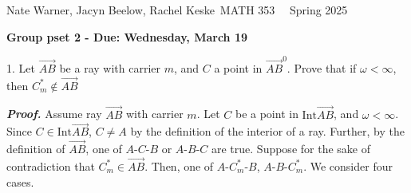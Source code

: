\documentclass{report}
\title{\Huge{}}
\author{\huge{Nathan Warner}}
\date{\huge{}}
\begin{document}
    \pagebreak \bigbreak \noindent 
    Nate Warner, Jacyn Beelow, Rachel Keske\ \quad \quad \quad \quad  MATH 353 \quad  \quad \quad \quad \quad \quad \ \ \quad \quad \quad \quad \quad \quad \quad Spring 2025
    \begin{center}
        \textbf{Group pset 2 - Due: Wednesday, March 19}
    \end{center}
    \bigbreak \noindent 
    \begin{mdframed}
        1. Let $\overrightarrow{AB}$ be a ray with carrier $m$, and $C$ a point in $\overrightarrow{AB}^{0} $. Prove that if $\omega < \infty$, then $C_{m}^{*} \not\in \overrightarrow{AB} $
    \end{mdframed}
    \bigbreak \noindent 
    \textbf{\textit{Proof.}} Assume ray $\overrightarrow{AB}$  with carrier $m$. Let $C$ be a point in $\text{Int}\overrightarrow{AB}$, and $\omega < \infty$.
    \bigbreak \noindent 
    Since $C \in \text{Int}\overrightarrow{AB}$, $C \ne A$ by the definition of the interior of a ray. Further, by the definition of $\overrightarrow{AB}$, one of $ A\text{-}C\text{-}B$ or $ A\text{-}B\text{-}C$ are true.
    \bigbreak \noindent 
    Suppose for the sake of contradiction that $C^{*}_{m} \in \overrightarrow{AB}$. Then, one of $ A\text{-}C^{*}_{m}\text{-}B$, $ A\text{-}B\text{-}C_{m}^{*}$. We consider four cases.
\end{document}
